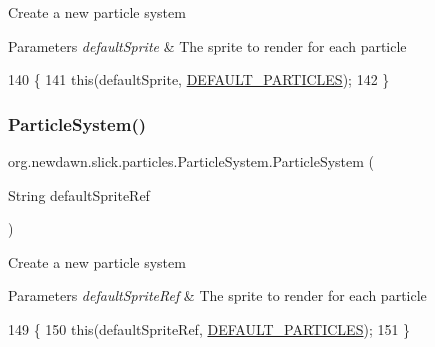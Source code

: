 Create a new particle system


\begin{DoxyParams}{Parameters}
{\em default\+Sprite} & The sprite to render for each particle \\
\hline
\end{DoxyParams}

\begin{DoxyCode}
140                                                \{
141         \textcolor{keyword}{this}(defaultSprite, \mbox{\hyperlink{classorg_1_1newdawn_1_1slick_1_1particles_1_1_particle_system_a997a488279d52e891828eb1e3f2d5aff}{DEFAULT\_PARTICLES}});
142     \}
\end{DoxyCode}
\mbox{\label{classorg_1_1newdawn_1_1slick_1_1particles_1_1_particle_system_a11617a1affa327ab75563754741dddf5}} 
\subsubsection{\texorpdfstring{Particle\+System()}{ParticleSystem()}\hspace{0.1cm}{\footnotesize\ttfamily [2/5]}}
{\footnotesize\ttfamily org.\+newdawn.\+slick.\+particles.\+Particle\+System.\+Particle\+System (\begin{DoxyParamCaption}\item[{String}]{default\+Sprite\+Ref }\end{DoxyParamCaption})\hspace{0.3cm}{\ttfamily [inline]}}

Create a new particle system


\begin{DoxyParams}{Parameters}
{\em default\+Sprite\+Ref} & The sprite to render for each particle \\
\hline
\end{DoxyParams}

\begin{DoxyCode}
149                                                    \{
150         \textcolor{keyword}{this}(defaultSpriteRef, \mbox{\hyperlink{classorg_1_1newdawn_1_1slick_1_1particles_1_1_particle_system_a997a488279d52e891828eb1e3f2d5aff}{DEFAULT\_PARTICLES}});
151     \}
\end{DoxyCode}
\mbox{\label{classorg_1_1newdawn_1_1slick_1_1particles_1_1_particle_system_a5b93e9be66c34e8edabfd5048c005671}} 
